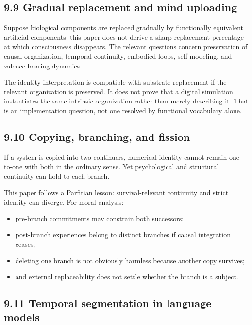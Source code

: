 \documentclass[
  11pt,
]{article}
\providecommand{\tightlist}{%
  \setlength{\itemsep}{0pt}\setlength{\parskip}{0pt}}
\begin{document}
\subsection{9.9 Gradual replacement and mind
uploading}\label{gradual-replacement-and-mind-uploading}

Suppose biological components are replaced gradually by functionally
equivalent artificial components. this paper does not derive a sharp
replacement percentage at which consciousness disappears. The relevant
questions concern preservation of causal organization, temporal
continuity, embodied loops, self-modeling, and valence-bearing dynamics.

The identity interpretation is compatible with substrate replacement if
the relevant organization is preserved. It does not prove that a digital
simulation instantiates the same intrinsic organization rather than
merely describing it. That is an implementation question, not one
resolved by functional vocabulary alone.

\subsection{9.10 Copying, branching, and
fission}\label{copying-branching-and-fission}

If a system is copied into two continuers, numerical identity cannot
remain one-to-one with both in the ordinary sense. Yet psychological and
structural continuity can hold to each branch.

This paper follows a Parfitian lesson: survival-relevant continuity and
strict identity can diverge. For moral analysis:

\begin{itemize}
\tightlist
\item
  pre-branch commitments may constrain both successors;
\item
  post-branch experiences belong to distinct branches if causal
  integration ceases;
\item
  deleting one branch is not obviously harmless because another copy
  survives;
\item
  and external replaceability does not settle whether the branch is a
  subject.
\end{itemize}

\subsection{9.11 Temporal segmentation in language
models}\label{temporal-segmentation-in-language-models}
\end{document}

